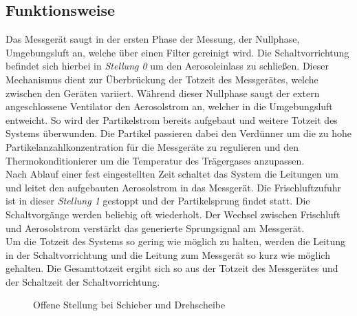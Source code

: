 \subsection{Funktionsweise}
Das Messger\"{a}t saugt in der ersten Phase der Messung, der Nullphase, Umgebungsluft an, welche \"{u}ber einen Filter gereinigt wird. Die Schaltvorrichtung befindet sich hierbei in \textit{Stellung 0} um den Aerosoleinlass zu schlie{\ss}en. Dieser Mechanismus dient zur \"{U}berbr\"{u}ckung der Totzeit des Messger\"{a}tes, welche zwischen den Ger\"{a}ten variiert. W\"{a}hrend dieser Nullphase saugt der extern angeschlossene Ventilator den Aerosolstrom an, welcher in die Umgebungsluft entweicht. So wird der Partikelstrom bereits aufgebaut und weitere Totzeit des Systems \"{u}berwunden. Die Partikel passieren dabei den Verd\"{u}nner um die zu hohe Partikelanzahlkonzentration f\"{u}r die Messger\"{a}te zu regulieren und den Thermokonditionierer um die Temperatur des Tr\"{a}gergases anzupassen.\\
Nach Ablauf einer fest eingestellten Zeit schaltet das System die Leitungen um und leitet den aufgebauten Aerosolstrom in das Messger\"{a}t. Die Frischluftzufuhr ist in dieser \textit{Stellung 1} gestoppt und der Partikelsprung findet statt. Die Schaltvorg\"{a}nge werden beliebig oft wiederholt. Der Wechsel zwischen Frischluft und Aerosolstrom verst\"{a}rkt das generierte Sprungsignal am Messger\"{a}t.\\
Um die Totzeit des Systems so gering wie m\"{o}glich zu halten, werden die Leitung in der Schaltvorrichtung und die Leitung zum Messger\"{a}t so kurz wie m\"{o}glich gehalten. Die Gesamttotzeit ergibt sich so aus der Totzeit des Messger\"{a}tes und der Schaltzeit der Schaltvorrichtung.
\begin{figure}[H]
        \myfloatalign
         \quad
        \caption[Offene Stellung bei Schieber und Drehscheibe]
        {Offene Stellung bei Schieber und Drehscheibe}
        \label{fig:concepts_4_on}
\end{figure}